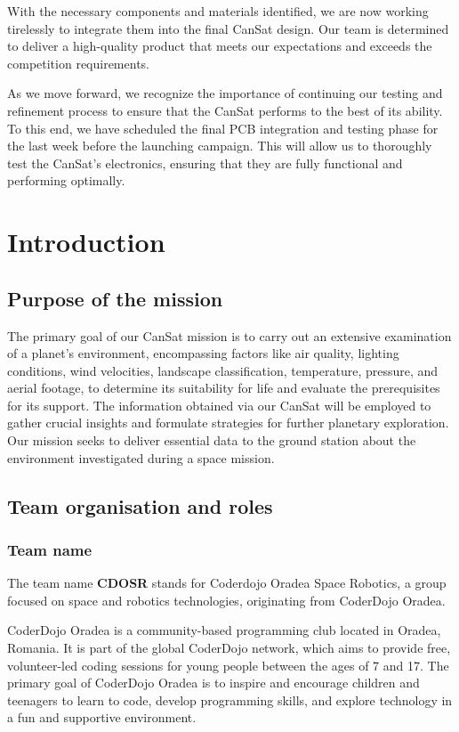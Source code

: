 \documentclass[11pt]{article}
\begin{document}
With the necessary components and materials identified, we are now working tirelessly to integrate them into the final CanSat design. Our team is determined to deliver a high-quality product that meets our expectations and exceeds the competition requirements.

As we move forward, we recognize the importance of continuing our testing and refinement process to ensure that the CanSat performs to the best of its ability. To this end, we have scheduled the final PCB integration and testing phase for the last week before the launching campaign. This will allow us to thoroughly test the CanSat's electronics, ensuring that they are fully functional and performing optimally.




\section{Introduction}

\subsection{Purpose of the mission}

The primary goal of our CanSat mission is to carry out an extensive examination of a planet's environment, encompassing factors like air quality, lighting conditions, wind velocities, landscape classification, temperature, pressure, and aerial footage, to determine its suitability for life and evaluate the prerequisites for its support. The information obtained via our CanSat will be employed to gather crucial insights and formulate strategies for further planetary exploration. Our mission seeks to deliver essential data to the ground station about the environment investigated during a space mission.

\subsection{Team organisation and roles}

\subsubsection{Team name}
The team name {\textbf{CDOSR}} stands for Coderdojo Oradea Space Robotics, a group focused on space and robotics technologies, originating from CoderDojo Oradea. 

CoderDojo Oradea is a community-based programming club located in Oradea, Romania. It is part of the global CoderDojo network, which aims to provide free, volunteer-led coding sessions for young people between the ages of 7 and 17. The primary goal of CoderDojo Oradea is to inspire and encourage children and teenagers to learn to code, develop programming skills, and explore technology in a fun and supportive environment.
\end{document}
